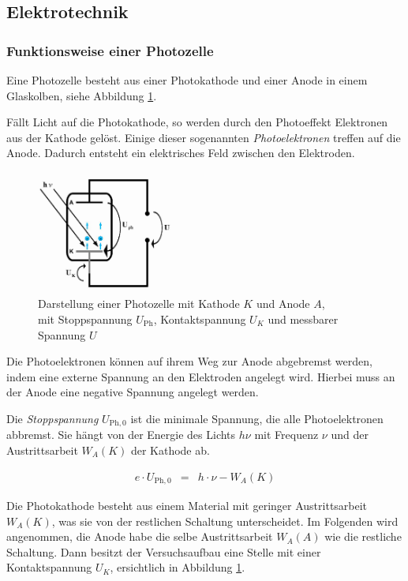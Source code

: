 \documentclass[12pt,a4paper]{scrartcl}
\numberwithin{equation}{section} %
\begin{document}
\subsection{Elektrotechnik}
\subsubsection{Funktionsweise einer Photozelle}
Eine Photozelle besteht aus einer Photokathode und einer Anode in einem Glaskolben, siehe Abbildung \ref{fig:photozelle}.

Fällt Licht auf die Photokathode, so werden durch den Photoeffekt Elektronen aus der Kathode gelöst. Einige dieser sogenannten \textit{Photoelektronen} treffen auf die Anode. Dadurch entsteht ein elektrisches Feld zwischen den Elektroden.

\begin{figure}[h]
	\centering
	\includegraphics[width=0.4\textwidth]{../media/B1.4/Photozelle.jpg}
	\caption{Darstellung einer Photozelle mit Kathode $K$ und Anode $A$, \\
		mit Stoppspannung $U_\mathrm{Ph}$, Kontaktspannung $U_K$ und messbarer Spannung $U$ \cite{uni}}
	\label{fig:photozelle}
\end{figure}

Die Photoelektronen können auf ihrem Weg zur Anode abgebremst werden, indem eine externe Spannung an den Elektroden angelegt wird. Hierbei muss an der Anode eine negative Spannung angelegt werden.

Die \textit{Stoppspannung} $U_{\mathrm{Ph}, 0}$ ist die minimale Spannung, die alle Photoelektronen abbremst. Sie hängt von der Energie des Lichts $h\nu$ mit Frequenz $\nu$ und der Austrittsarbeit $W_A(K)$ der Kathode ab. \cite{Gerthsen}

\begin{eqnarray}
	e \cdot U_{\mathrm{Ph}, 0} &=& h \cdot \nu - W_A (K) \label{eq:Stoppspannung}
\end{eqnarray}

\noindent
Die Photokathode besteht aus einem Material mit geringer Austrittsarbeit $W_A(K)$, was sie von der restlichen Schaltung unterscheidet. Im Folgenden wird angenommen, die Anode habe die selbe Austrittsarbeit $W_A(A)$ wie die restliche Schaltung. Dann besitzt der Versuchsaufbau eine Stelle mit einer Kontaktspannung $U_K$, ersichtlich in Abbildung \ref{fig:photozelle}.
\end{document}
